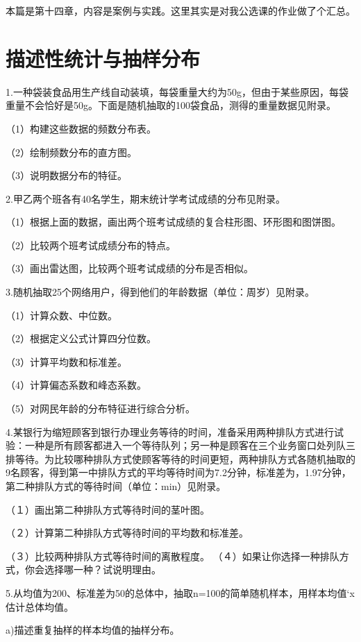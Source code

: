 \documentclass[]{ctexbook}
\begin{document}
本篇是第十四章，内容是案例与实践。这里其实是对我公选课的作业做了个汇总。

\hypertarget{ux63cfux8ff0ux6027ux7edfux8ba1ux4e0eux62bdux6837ux5206ux5e03}{%
\section{描述性统计与抽样分布}\label{ux63cfux8ff0ux6027ux7edfux8ba1ux4e0eux62bdux6837ux5206ux5e03}}

1.一种袋装食品用生产线自动装填，每袋重量大约为50g，但由于某些原因，每袋重量不会恰好是50g。下面是随机抽取的100袋食品，测得的重量数据见附录。

（1）构建这些数据的频数分布表。

（2）绘制频数分布的直方图。

（3）说明数据分布的特征。

2.甲乙两个班各有40名学生，期末统计学考试成绩的分布见附录。

（1）根据上面的数据，画出两个班考试成绩的复合柱形图、环形图和图饼图。

（2）比较两个班考试成绩分布的特点。

（3）画出雷达图，比较两个班考试成绩的分布是否相似。

3.随机抽取25个网络用户，得到他们的年龄数据（单位：周岁）见附录。

（1）计算众数、中位数。

（2）根据定义公式计算四分位数。

（3）计算平均数和标准差。

（4）计算偏态系数和峰态系数。

（5）对网民年龄的分布特征进行综合分析。

4.某银行为缩短顾客到银行办理业务等待的时间，准备采用两种排队方式进行试验：一种是所有顾客都进入一个等待队列；另一种是顾客在三个业务窗口处列队三排等待。为比较哪种排队方式使顾客等待的时间更短，两种排队方式各随机抽取的9名顾客，得到第一中排队方式的平均等待时间为7.2分钟，标准差为，1.97分钟，第二种排队方式的等待时间（单位：min）见附录。

（１）画出第二种排队方式等待时间的茎叶图。

（２）计算第二种排队方式等待时间的平均数和标准差。

（３）比较两种排队方式等待时间的离散程度。
（４）如果让你选择一种排队方式，你会选择哪一种？试说明理由。

5.从均值为200、标准差为50的总体中，抽取n=100的简单随机样本，用样本均值`x估计总体均值。

a)描述重复抽样的样本均值的抽样分布。
\end{document}
